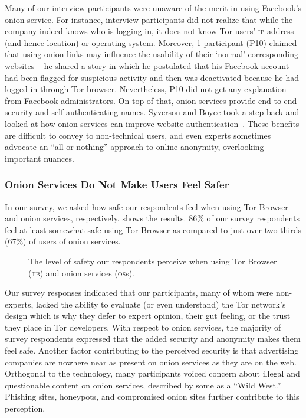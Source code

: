 Many of our  interview participants were unaware of the merit in using Facebook's onion service. For instance, interview participants did not realize that while the company indeed
knows who is logging in, it does not know Tor users' \textsc{ip} address (and
hence location) or operating system.  Moreover, 1 participant (P10) claimed that using onion links may influence the usability of their ‘normal’ corresponding websites – he shared a story in which he postulated that his Facebook account had been flagged for suspicious activity and then was deactivated because he had logged in through Tor browser.  Nevertheless, P10 did not get any explanation from Facebook administrators. On top of that, onion services provide
end-to-end security and self-authenticating names.  Syverson and Boyce took a
step back and looked at how onion services can improve website
authentication~\cite{Syverson2015a}.  These benefits are difficult to convey to
non-technical users, and even experts sometimes advocate an ``all or nothing''
approach to online anonymity, overlooking important nuances.

\subsubsection{Onion Services Do Not Make Users Feel Safer}
In our survey, we asked how safe our
respondents feel when using Tor Browser and onion services, respectively.
 shows the results.  
86\% of our survey respondents feel at least somewhat safe using Tor Browser as compared to just over two thirds (67\%) of users of onion services.

\begin{figure}[t]
    \centering
    
    \caption{The level of safety our respondents perceive when using Tor
    Browser (\textsc{tb}) and onion services (\textsc{os}s).}
    \label{fig:perceived-security}
\end{figure}

Our survey responses indicated that our participants, many of whom were non-experts, lacked the ability to evaluate (or even understand) the
Tor network's design which is why they defer to expert opinion, their gut
feeling, or the trust they place in Tor developers.  With respect to onion
services, the majority of survey respondents expressed that the added security and anonymity makes
them feel safe.  Another factor contributing to the perceived security is that
advertising companies are nowhere near as present on onion services as they are
on the web.  Orthogonal to the technology, many participants voiced concern
about illegal and questionable content on onion services, described by some as a
``Wild West.'' Phishing sites, honeypots, and compromised onion sites further
contribute to this perception.

